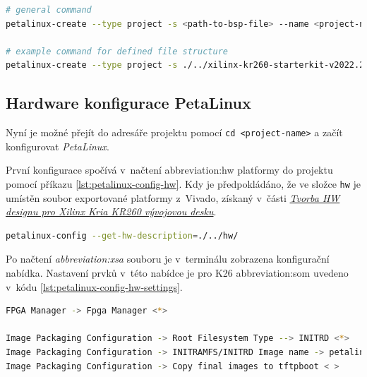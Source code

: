 \documentclass[a4paper, twoside, 11pt]{article}
\newcommand{\fbar}{\FloatBarrier}
\begin{document}
	\begin{lstlisting}[language={sh}, caption={Tvorba PetaLinux projektu ze základního \gls{abbreviation:bsp} souboru.}, label= {lst:petalinux-create}, morekeywords={petalinux-build, petalinux-package, petalinux-config, petalinux-create}]
# general command
petalinux-create --type project -s <path-to-bsp-file> --name <project-name>

# example command for defined file structure
petalinux-create --type project -s ./../xilinx-kr260-starterkit-v2022.2-10141622.bsp --name petalinux\end{lstlisting}

	\fbar
	\subsection{Hardware konfigurace PetaLinux}
	Nyní je možné přejít do adresáře projektu pomocí \texttt{cd <project-name>} a začít konfigurovat \textit{PetaLinux}.\par
	První konfigurace spočívá v~načtení \gls{abbreviation:hw} platformy do projektu pomocí příkazu \ref{lst:petalinux-config-hw}. Kdy je předpokládáno, že ve složce \texttt{hw} je umístěn soubor exportované platformy z~Vivado, získaný v~části \hyperref[subsec:tvorba-hw-designu-pro-xilinx-kria-kr260]{\textit{Tvorba HW designu pro Xilinx Kria KR260 vývojovou desku}}.\par


	\begin{lstlisting}[language={sh}, caption={Konfigurace PetaLinux pomocí \gls{abbreviation:xpr} souboru z~Vivado.}, label= {lst:petalinux-config-hw}, morekeywords={petalinux-build, petalinux-package, petalinux-config}]
petalinux-config --get-hw-description=./../hw/\end{lstlisting}

	Po načtení \textit{\gls{abbreviation:xsa}} souboru je v~terminálu zobrazena konfigurační nabídka. Nastavení prvků v~této nabídce je pro K26 \gls{abbreviation:som} uvedeno v~kódu \ref{lst:petalinux-config-hw-settings}.



\begin{lstlisting}[language={sh}, caption={Nastavení v~petalinux-config pro Xilix K26 SOM.}, label= {lst:petalinux-config-hw-settings}]
FPGA Manager -> Fpga Manager <*>

Image Packaging Configuration -> Root Filesystem Type --> INITRD <*>
Image Packaging Configuration -> INITRAMFS/INITRD Image name -> petalinux-initramfs-image <*>
Image Packaging Configuration -> Copy final images to tftpboot < >\end{lstlisting}
\end{document}
